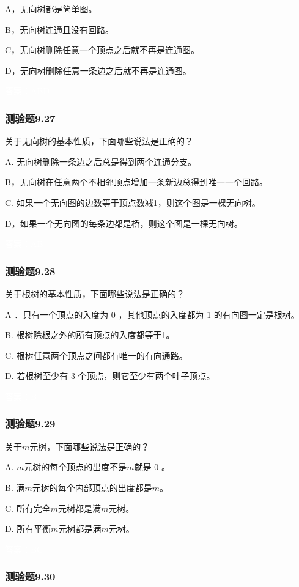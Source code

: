 \documentclass[UTF8, heading=true]{ctexart}
\begin{document}
A，无向树都是简单图。

B，无向树连通且没有回路。

C，无向树删除任意一个顶点之后就不再是连通图。

D，无向树删除任意一条边之后就不再是连通图。


\textcolor{white}{答案：ABD}

\subsubsection{测验题9.27}

关于无向树的基本性质，下面哪些说法是正确的？

A. 无向树删除一条边之后总是得到两个连通分支。

B，无向树在任意两个不相邻顶点增加一条新边总得到唯一一个回路。

C. 如果一个无向图的边数等于顶点数减1，则这个图是一棵无向树。

D，如果一个无向图的每条边都是桥，则这个图是一棵无向树。

\textcolor{white}{答案：AB}

\subsubsection{测验题9.28}

关于根树的基本性质，下面哪些说法是正确的？

A ．只有一个顶点的入度为 0 ，其他顶点的入度都为 1 的有向图一定是根树。

B. 根树除根之外的所有顶点的入度都等于1。

C. 根树任意两个顶点之间都有唯一的有向通路。

D.  若根树至少有 3 个顶点，则它至少有两个叶子顶点。

\textcolor{white}{答案：B}

\subsubsection{测验题9.29}

关于$m$元树，下面哪些说法是正确的？

A. $m$元树的每个顶点的出度不是$m$就是 0 。

B. 满$m$元树的每个内部顶点的出度都是$m$。

C. 所有完全$m$元树都是满$m$元树。

D.  所有平衡$m$元树都是满$m$元树。


\textcolor{white}{答案：BC}

\subsubsection{测验题9.30}
\end{document}

